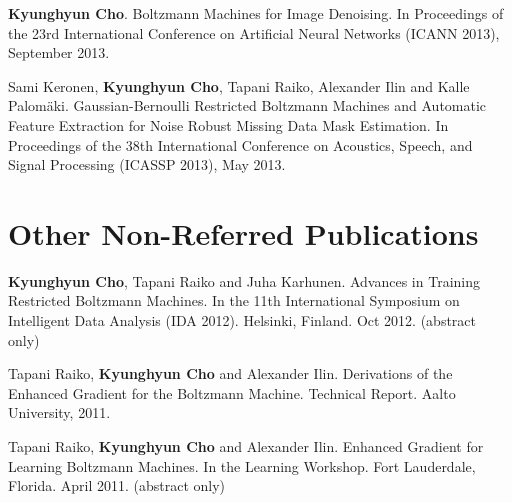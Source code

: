 \documentclass[11pt, oneside]{essay}
\begin{document}
\textbf{Kyunghyun Cho}. Boltzmann Machines for Image Denoising. In
Proceedings of the 23rd International Conference on
Artificial Neural Networks (ICANN 2013), September 2013.

Sami Keronen, \textbf{Kyunghyun Cho}, Tapani Raiko, Alexander Ilin
and Kalle Palom\"aki. Gaussian-Bernoulli Restricted Boltzmann
Machines and Automatic Feature Extraction for Noise Robust
Missing Data Mask Estimation. In Proceedings of the 38th
International Conference on Acoustics, Speech, and Signal
Processing (ICASSP 2013), May 2013.




\section{Other Non-Referred Publications}

\textbf{Kyunghyun Cho}, Tapani Raiko and Juha Karhunen.
Advances in Training Restricted Boltzmann Machines.
In the 11th International Symposium on Intelligent Data
Analysis (IDA 2012). Helsinki, Finland. Oct 2012. (abstract
only)

Tapani Raiko, \textbf{Kyunghyun Cho} and Alexander Ilin.
Derivations of the Enhanced Gradient for the Boltzmann
Machine.  Technical Report. Aalto University, 2011.

Tapani Raiko, \textbf{Kyunghyun Cho} and Alexander Ilin.
Enhanced Gradient for Learning Boltzmann Machines.
In the Learning Workshop. Fort Lauderdale, Florida. April
2011. (abstract only)
\end{document}

